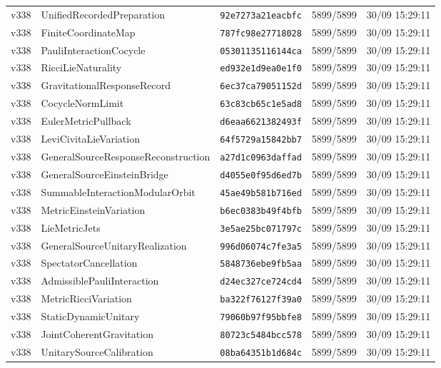 \documentclass[11pt]{article}
\theoremstyle{definition}\newtheorem{deriv}{Derivação}
\begin{document}
{\begin{longtable}{@{}lllll@{}}
v338 & UnifiedRecordedPreparation & \texttt{92e7273a21eacbfc} & 5899/5899 & 30/09 15:29:11 \\
v338 & FiniteCoordinateMap & \texttt{787fc98e27718028} & 5899/5899 & 30/09 15:29:11 \\
v338 & PauliInteractionCocycle & \texttt{05301135116144ca} & 5899/5899 & 30/09 15:29:11 \\
v338 & RicciLieNaturality & \texttt{ed932e1d9ea0e1f0} & 5899/5899 & 30/09 15:29:11 \\
v338 & GravitationalResponseRecord & \texttt{6ec37ca79051152d} & 5899/5899 & 30/09 15:29:11 \\
v338 & CocycleNormLimit & \texttt{63c83cb65c1e5ad8} & 5899/5899 & 30/09 15:29:11 \\
v338 & EulerMetricPullback & \texttt{d6eaa6621382493f} & 5899/5899 & 30/09 15:29:11 \\
v338 & LeviCivitaLieVariation & \texttt{64f5729a15842bb7} & 5899/5899 & 30/09 15:29:11 \\
v338 & GeneralSourceResponseReconstruction & \texttt{a27d1c0963daffad} & 5899/5899 & 30/09 15:29:11 \\
v338 & GeneralSourceEinsteinBridge & \texttt{d4055e0f95d6ed7b} & 5899/5899 & 30/09 15:29:11 \\
v338 & SummableInteractionModularOrbit & \texttt{45ae49b581b716ed} & 5899/5899 & 30/09 15:29:11 \\
v338 & MetricEinsteinVariation & \texttt{b6ec0383b49f4bfb} & 5899/5899 & 30/09 15:29:11 \\
v338 & LieMetricJets & \texttt{3e5ae25bc071797c} & 5899/5899 & 30/09 15:29:11 \\
v338 & GeneralSourceUnitaryRealization & \texttt{996d06074c7fe3a5} & 5899/5899 & 30/09 15:29:11 \\
v338 & SpectatorCancellation & \texttt{5848736ebe9fb5aa} & 5899/5899 & 30/09 15:29:11 \\
v338 & AdmissiblePauliInteraction & \texttt{d24ec327ce724cd4} & 5899/5899 & 30/09 15:29:11 \\
v338 & MetricRicciVariation & \texttt{ba322f76127f39a0} & 5899/5899 & 30/09 15:29:11 \\
v338 & StaticDynamicUnitary & \texttt{79060b97f95bbfe8} & 5899/5899 & 30/09 15:29:11 \\
v338 & JointCoherentGravitation & \texttt{80723c5484bcc578} & 5899/5899 & 30/09 15:29:11 \\
v338 & UnitarySourceCalibration & \texttt{08ba64351b1d684c} & 5899/5899 & 30/09 15:29:11 \\

\end{longtable}}
\end{document}
